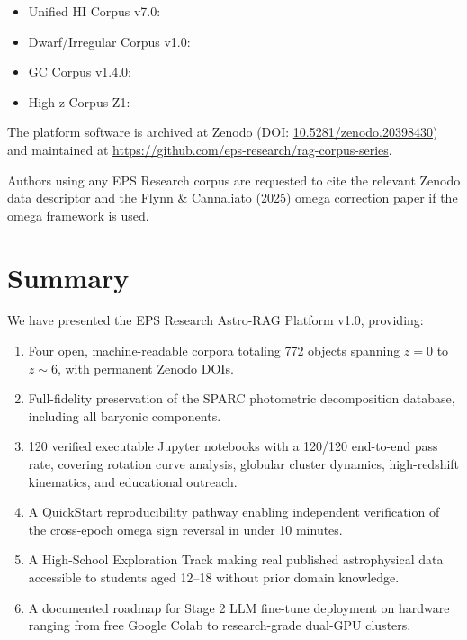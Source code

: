 \documentclass[twocolumn]{aastex631}
\begin{document}
\begin{itemize}
\item Unified HI Corpus v7.0: 
\item Dwarf/Irregular Corpus v1.0: 
\item GC Corpus v1.4.0: 
\item High-z Corpus Z1: 
\end{itemize}

The platform software is archived at Zenodo
(DOI: \href{https://doi.org/10.5281/zenodo.20398430}{10.5281/zenodo.20398430})
and maintained at \url{https://github.com/eps-research/rag-corpus-series}.

Authors using any EPS Research corpus are requested to cite the relevant
Zenodo data descriptor and the Flynn \& Cannaliato (2025) omega correction
paper \citep{flynn2025} if the omega framework is used.

\section{Summary}
\label{sec:summary}

We have presented the EPS Research Astro-RAG Platform v1.0, providing:

\begin{enumerate}
\item Four open, machine-readable corpora totaling 772 objects spanning
      $z = 0$ to $z \sim 6$, with permanent Zenodo DOIs.
\item Full-fidelity preservation of the SPARC photometric decomposition
      database, including all baryonic components.
\item 120 verified executable Jupyter notebooks with a 120/120 end-to-end
      pass rate, covering rotation curve analysis, globular cluster dynamics,
      high-redshift kinematics, and educational outreach.
\item A QuickStart reproducibility pathway enabling independent verification
      of the cross-epoch omega sign reversal in under 10 minutes.
\item A High-School Exploration Track making real published astrophysical
      data accessible to students aged 12--18 without prior domain knowledge.
\item A documented roadmap for Stage 2 LLM fine-tune deployment on hardware
      ranging from free Google Colab to research-grade dual-GPU clusters.
\end{enumerate}
\end{document}
